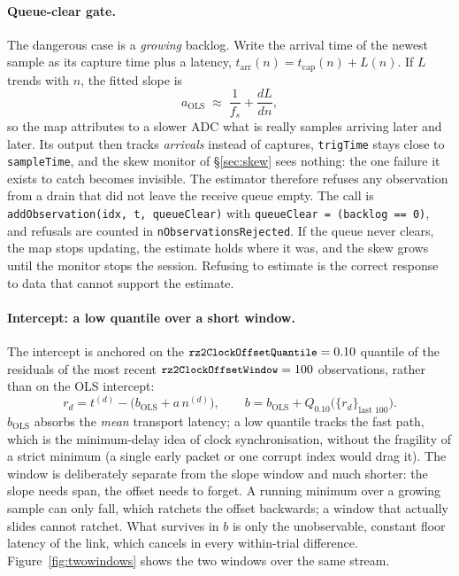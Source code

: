 \documentclass[11pt,a4paper]{article}
\newcommand{\code}[1]{\texttt{\small #1}}
\begin{document}
\paragraph{Queue-clear gate.} The dangerous case is a \emph{growing} backlog.
Write the arrival time of the newest sample as its capture time plus a latency,
$t_{\mathrm{arr}}(n) = t_{\mathrm{cap}}(n) + L(n)$. If $L$ trends with $n$, the
fitted slope is
\begin{equation}
  a_{\mathrm{OLS}} \;\approx\; \frac{1}{f_s} + \frac{dL}{dn},
  \label{eq:gate}
\end{equation}
so the map attributes to a slower ADC what is really samples arriving later and
later. Its output then tracks \emph{arrivals} instead of captures,
\code{trigTime} stays close to \code{sampleTime}, and the skew monitor of
\S\ref{sec:skew} sees nothing: the one failure it exists to catch becomes
invisible. The estimator therefore refuses any observation from a drain that
did not leave the receive queue empty. The call is
\code{addObservation(idx, t, queueClear)} with
\code{queueClear = (backlog == 0)}, and refusals are counted in
\code{nObservationsRejected}. If the queue never clears, the map stops updating,
the estimate holds where it was, and the skew grows until the monitor stops the
session. Refusing to estimate is the correct response to data that cannot
support the estimate.

\paragraph{Intercept: a low quantile over a short window.} The intercept is
anchored on the $\code{rz2ClockOffsetQuantile} = 0.10$ quantile of the
residuals of the most recent $\code{rz2ClockOffsetWindow} = 100$ observations,
rather than on the OLS intercept:
\begin{equation}
  r_d = t^{(d)} - \big(b_{\mathrm{OLS}} + a\,n^{(d)}\big),
  \qquad
  b = b_{\mathrm{OLS}} + Q_{0.10}\big(\{r_d\}_{\text{last }100}\big).
  \label{eq:offset}
\end{equation}
$b_{\mathrm{OLS}}$ absorbs the \emph{mean} transport latency; a low quantile
tracks the fast path, which is the minimum-delay idea of clock
synchronisation, without the fragility of a strict minimum (a single early
packet or one corrupt index would drag it). The window is deliberately separate
from the slope window and much shorter: the slope needs span, the offset needs
to forget. A running minimum over a growing sample can only fall, which
ratchets the offset backwards; a window that actually slides cannot ratchet.
What survives in $b$ is only the unobservable, constant floor latency of the
link, which cancels in every within-trial difference.
Figure~\ref{fig:twowindows} shows the two windows over the same stream.
\end{document}
